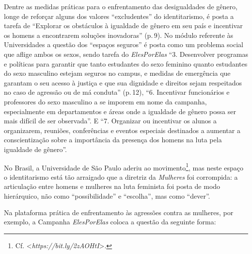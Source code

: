 Dentre as medidas práticas para o enfrentamento das desigualdades de
gênero, longe de reforçar alguns dos valores ``excludentes'' do
identitarismo, é posta a tarefa de ``Explorar os obstáculos à igualdade
de gênero em seu país e incentivar os homens a encontrarem soluções
inovadoras'' (p.\,9). No módulo referente às Universidades a questão dos
``espaços seguros'' é posta como um problema social que aflige ambos os
sexos, sendo tarefa do \emph{ElesPorElas} ``3. Desenvolver programas e
políticas para garantir que tanto estudantes do sexo feminino quanto
estudantes do sexo masculino estejam seguros no campus, e medidas de
emergência que garantam o seu acesso à justiça e que sua dignidade e
direitos sejam respeitados no caso de agressão ou de má conduta''
(p.\,12), ``6. Incentivar funcionários e professores do sexo masculino a
se imporem em nome da campanha, especialmente em departamentos e áreas
onde a igualdade de gênero possa ser mais difícil de ser observada''. E
``7. Organizar ou incentivar os alunos a organizarem, reuniões,
conferências e eventos especiais destinados a aumentar a conscientização
sobre a importância da presença dos homens na luta pela igualdade de
gênero''.

No Brasil, a Universidade de São Paulo aderiu ao movimento\footnote{Cf.
  \textless{}\emph{https://bit.ly/2zAOHtI}\textgreater{}.},
mas neste espaço o identitarismo está tão arraigado que a diretriz da
\emph{ Mulheres} foi corrompida: a articulação entre homens e
mulheres na luta feminista foi posta de modo hierárquico, não como
``possibilidade'' e ``escolha'', mas como ``dever''.


Na plataforma prática de enfrentamento às agressões contra as mulheres,
por exemplo, a Campanha \emph{ElesPorElas} coloca a questão da seguinte
forma:

